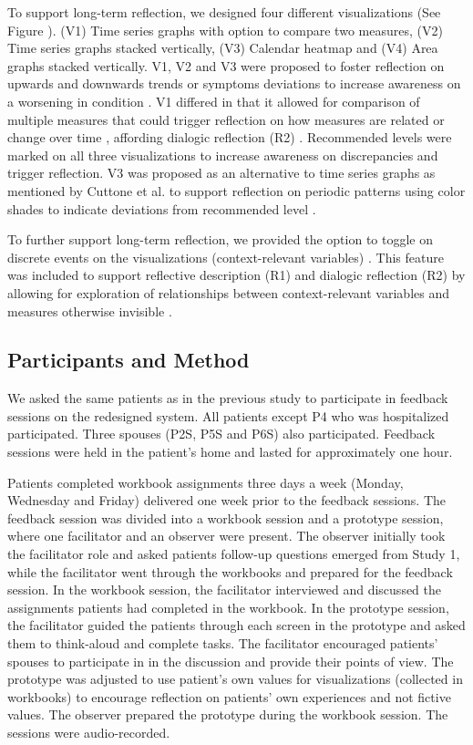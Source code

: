 To support long-term reflection, we designed four different visualizations (See Figure ). (V1) Time series graphs with option to compare two measures, (V2) Time series graphs stacked vertically, (V3) Calendar heatmap and (V4) Area graphs stacked vertically. V1, V2 and V3 were proposed to foster reflection on upwards and downwards trends or symptoms deviations to increase awareness on a worsening in condition \cite{Rivera}. V1 differed in that it allowed for comparison of multiple measures that could trigger reflection on how measures are related or change over time \cite{Cuttone}, affording dialogic reflection (R2) \cite{Fleck}. Recommended levels were marked on all three visualizations to increase awareness on discrepancies \cite{Li2010} and trigger reflection. V3 was proposed as an alternative to time series graphs as mentioned by Cuttone et al. to support reflection on periodic patterns using color shades to indicate deviations from recommended level \cite{Cuttone, Li2010}.  

To further support long-term reflection, we provided the option to toggle on discrete events on the visualizations (context-relevant variables) \cite{Sorensen}. This feature was included to support reflective description (R1) and dialogic reflection (R2) by allowing for exploration of relationships between context-relevant variables and measures otherwise invisible \cite{Fleck}.  

\subsection{Participants and Method}
We asked the same patients as in the previous study to participate in feedback sessions on the redesigned system. All patients except P4 who was hospitalized participated. Three spouses (P2S, P5S and P6S) also participated. Feedback sessions were held in the patient’s home and lasted for approximately one hour.

Patients completed workbook assignments three days a week (Monday, Wednesday and Friday) delivered one week prior to the feedback sessions. The feedback session was divided into a workbook session and a prototype session, where one facilitator and an observer were present. The observer initially took the facilitator role and asked patients follow-up questions emerged from Study 1, while the facilitator went through the workbooks and prepared for the feedback session. In the workbook session, the facilitator interviewed and discussed the assignments patients had completed in the workbook. In the prototype session, the facilitator guided the patients through each screen in the prototype and asked them to think-aloud and complete tasks. The facilitator encouraged patients’ spouses to participate in in the discussion and provide their points of view. The prototype was adjusted to use patient’s own values for visualizations (collected in workbooks) to encourage reflection on patients’ own experiences and not fictive values. The observer prepared the prototype during the workbook session. The sessions were audio-recorded.

